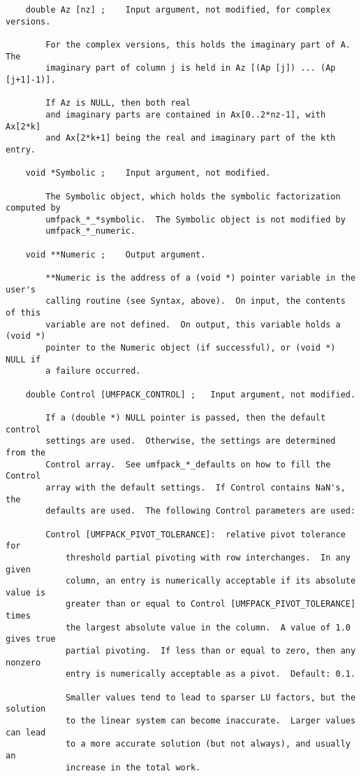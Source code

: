 \documentclass[11pt]{article}
\begin{document}
{\begin{verbatim}
    double Az [nz] ;    Input argument, not modified, for complex versions.

        For the complex versions, this holds the imaginary part of A.  The
        imaginary part of column j is held in Az [(Ap [j]) ... (Ap [j+1]-1)].

        If Az is NULL, then both real
        and imaginary parts are contained in Ax[0..2*nz-1], with Ax[2*k]
        and Ax[2*k+1] being the real and imaginary part of the kth entry.

    void *Symbolic ;    Input argument, not modified.

        The Symbolic object, which holds the symbolic factorization computed by
        umfpack_*_*symbolic.  The Symbolic object is not modified by
        umfpack_*_numeric.

    void **Numeric ;    Output argument.

        **Numeric is the address of a (void *) pointer variable in the user's
        calling routine (see Syntax, above).  On input, the contents of this
        variable are not defined.  On output, this variable holds a (void *)
        pointer to the Numeric object (if successful), or (void *) NULL if
        a failure occurred.

    double Control [UMFPACK_CONTROL] ;   Input argument, not modified.

        If a (double *) NULL pointer is passed, then the default control
        settings are used.  Otherwise, the settings are determined from the
        Control array.  See umfpack_*_defaults on how to fill the Control
        array with the default settings.  If Control contains NaN's, the
        defaults are used.  The following Control parameters are used:

        Control [UMFPACK_PIVOT_TOLERANCE]:  relative pivot tolerance for
            threshold partial pivoting with row interchanges.  In any given
            column, an entry is numerically acceptable if its absolute value is
            greater than or equal to Control [UMFPACK_PIVOT_TOLERANCE] times
            the largest absolute value in the column.  A value of 1.0 gives true
            partial pivoting.  If less than or equal to zero, then any nonzero
            entry is numerically acceptable as a pivot.  Default: 0.1.

            Smaller values tend to lead to sparser LU factors, but the solution
            to the linear system can become inaccurate.  Larger values can lead
            to a more accurate solution (but not always), and usually an
            increase in the total work.


\end{verbatim}}
\end{document}
